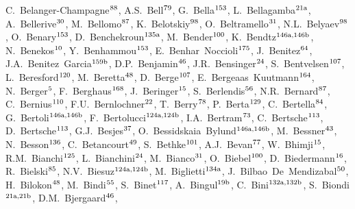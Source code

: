 \begin{flushleft}
C.~Belanger-Champagne$^\textrm{\scriptsize 88}$,
A.S.~Bell$^\textrm{\scriptsize 79}$,
G.~Bella$^\textrm{\scriptsize 153}$,
L.~Bellagamba$^\textrm{\scriptsize 21a}$,
A.~Bellerive$^\textrm{\scriptsize 30}$,
M.~Bellomo$^\textrm{\scriptsize 87}$,
K.~Belotskiy$^\textrm{\scriptsize 98}$,
O.~Beltramello$^\textrm{\scriptsize 31}$,
N.L.~Belyaev$^\textrm{\scriptsize 98}$,
O.~Benary$^\textrm{\scriptsize 153}$,
D.~Benchekroun$^\textrm{\scriptsize 135a}$,
M.~Bender$^\textrm{\scriptsize 100}$,
K.~Bendtz$^\textrm{\scriptsize 146a,146b}$,
N.~Benekos$^\textrm{\scriptsize 10}$,
Y.~Benhammou$^\textrm{\scriptsize 153}$,
E.~Benhar~Noccioli$^\textrm{\scriptsize 175}$,
J.~Benitez$^\textrm{\scriptsize 64}$,
J.A.~Benitez~Garcia$^\textrm{\scriptsize 159b}$,
D.P.~Benjamin$^\textrm{\scriptsize 46}$,
J.R.~Bensinger$^\textrm{\scriptsize 24}$,
S.~Bentvelsen$^\textrm{\scriptsize 107}$,
L.~Beresford$^\textrm{\scriptsize 120}$,
M.~Beretta$^\textrm{\scriptsize 48}$,
D.~Berge$^\textrm{\scriptsize 107}$,
E.~Bergeaas~Kuutmann$^\textrm{\scriptsize 164}$,
N.~Berger$^\textrm{\scriptsize 5}$,
F.~Berghaus$^\textrm{\scriptsize 168}$,
J.~Beringer$^\textrm{\scriptsize 15}$,
S.~Berlendis$^\textrm{\scriptsize 56}$,
N.R.~Bernard$^\textrm{\scriptsize 87}$,
C.~Bernius$^\textrm{\scriptsize 110}$,
F.U.~Bernlochner$^\textrm{\scriptsize 22}$,
T.~Berry$^\textrm{\scriptsize 78}$,
P.~Berta$^\textrm{\scriptsize 129}$,
C.~Bertella$^\textrm{\scriptsize 84}$,
G.~Bertoli$^\textrm{\scriptsize 146a,146b}$,
F.~Bertolucci$^\textrm{\scriptsize 124a,124b}$,
I.A.~Bertram$^\textrm{\scriptsize 73}$,
C.~Bertsche$^\textrm{\scriptsize 113}$,
D.~Bertsche$^\textrm{\scriptsize 113}$,
G.J.~Besjes$^\textrm{\scriptsize 37}$,
O.~Bessidskaia~Bylund$^\textrm{\scriptsize 146a,146b}$,
M.~Bessner$^\textrm{\scriptsize 43}$,
N.~Besson$^\textrm{\scriptsize 136}$,
C.~Betancourt$^\textrm{\scriptsize 49}$,
S.~Bethke$^\textrm{\scriptsize 101}$,
A.J.~Bevan$^\textrm{\scriptsize 77}$,
W.~Bhimji$^\textrm{\scriptsize 15}$,
R.M.~Bianchi$^\textrm{\scriptsize 125}$,
L.~Bianchini$^\textrm{\scriptsize 24}$,
M.~Bianco$^\textrm{\scriptsize 31}$,
O.~Biebel$^\textrm{\scriptsize 100}$,
D.~Biedermann$^\textrm{\scriptsize 16}$,
R.~Bielski$^\textrm{\scriptsize 85}$,
N.V.~Biesuz$^\textrm{\scriptsize 124a,124b}$,
M.~Biglietti$^\textrm{\scriptsize 134a}$,
J.~Bilbao~De~Mendizabal$^\textrm{\scriptsize 50}$,
H.~Bilokon$^\textrm{\scriptsize 48}$,
M.~Bindi$^\textrm{\scriptsize 55}$,
S.~Binet$^\textrm{\scriptsize 117}$,
A.~Bingul$^\textrm{\scriptsize 19b}$,
C.~Bini$^\textrm{\scriptsize 132a,132b}$,
S.~Biondi$^\textrm{\scriptsize 21a,21b}$,
D.M.~Bjergaard$^\textrm{\scriptsize 46}$,

\end{flushleft}
